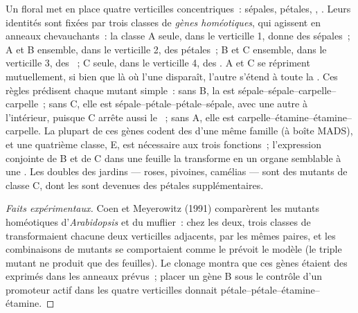 \begin{proposition}\label{prop:b2:plant-flowering:abc}
Un  floral met en place quatre verticilles concentriques~:
sépales, pétales, , . Leurs identités sont fixées par
trois classes de \emph{gènes homéotiques}, qui agissent en anneaux
chevauchants~: la classe A seule, dans le verticille 1, donne des
sépales~; A et B ensemble, dans le verticille 2, des pétales~; B et C
ensemble, dans le verticille 3, des ~; C seule, dans le
verticille 4, des . A et C se répriment mutuellement, si bien
que là où l'une disparaît, l'autre s'étend à toute la . Ces règles
prédisent chaque mutant simple~: sans B, la  est
sépale--sépale--carpelle--carpelle~; sans C, elle est
sépale--pétale--pétale--sépale, avec une autre  à l'intérieur,
puisque C arrête aussi le ~; sans A, elle est
carpelle--étamine--étamine--carpelle. La plupart de ces gènes codent des
 d'une même famille (à boîte MADS), et une
quatrième classe, E, est nécessaire aux trois fonctions~; l'expression
conjointe de B et de C dans une feuille la transforme en un organe
semblable à une . Les  doubles des jardins --- roses,
pivoines, camélias --- sont des mutants de classe C, dont les 
sont devenues des pétales supplémentaires.
\end{proposition}
\begin{proof}[Faits expérimentaux]
Coen et Meyerowitz (1991) comparèrent les mutants homéotiques
d'\emph{Arabidopsis} et du muflier~: chez les deux, trois classes de
 transformaient chacune deux verticilles adjacents, par les
mêmes paires, et les combinaisons de mutants se comportaient comme le
prévoit le modèle (le triple mutant ne produit que des feuilles). Le
clonage montra que ces gènes étaient des 
exprimés dans les anneaux prévus~; placer un gène B sous le contrôle d'un
promoteur actif dans les quatre verticilles donnait
pétale--pétale--étamine--étamine.
\end{proof}

